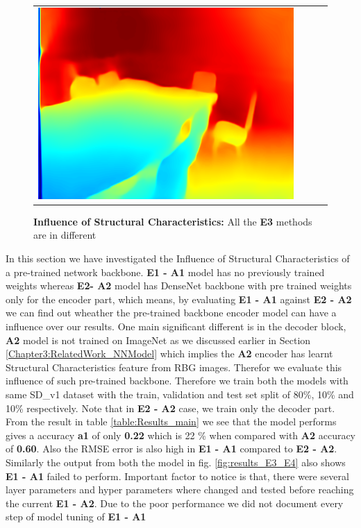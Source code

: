 \begin{figure}[h]
\begin{tabular}{@{}c@{ }c@{ }c@{ }c@{}}
\includegraphics[width=.3\linewidth]{Figures/results/s1_a1/0Predicted.png}\\[-1ex]
\end{tabular}
\caption{\textbf{Influence of Structural Characteristics:} All the \textbf{E3} methods are in different  }%
\label{fig:results_E1_E2}
\end{figure}

\label{Chapter6:Influence_Structural_Char}
In this section we have investigated the Influence of Structural Characteristics of a pre-trained network backbone. \textbf{E1 - A1} model has no previously trained weights whereas \textbf{E2- A2} model has DenseNet backbone with pre trained weights only for the encoder part, which means, by evaluating \textbf{E1 - A1} against \textbf{E2 - A2} we can find out wheather the pre-trained backbone encoder model can have a influence over our results. One main significant different is in the decoder block, \textbf{A2} model is not trained on ImageNet as we discussed earlier in Section \ref{Chapter3:RelatedWork_NNModel} which implies the \textbf{A2} encoder has learnt Structural Characteristics feature from RBG images. Therefor we evaluate this influence of such pre-trained backbone. Therefore we train both the models with same SD\_v1 dataset with the train, validation and test set split of 80\%, 10\%  and 10\% respectively. Note that in \textbf{E2 - A2} case, we train only the decoder part. From the result in table \ref{table:Results_main} we see that the model performs gives a accuracy \textbf{a1} of only \textbf{0.22} which is 22 \% when compared with \textbf{A2} accuracy of \textbf{0.60}. Also the RMSE error is also high in \textbf{E1 - A1} compared to \textbf{E2 - A2}. Similarly the output from both the model in fig. \ref{fig:results_E3_E4} also shows  \textbf{E1 - A1} failed to perform. Important factor to notice is that, there were several layer parameters and hyper parameters where changed and tested before reaching the current \textbf{E1 - A2}. Due to the poor performance we did not document every step of model tuning of \textbf{E1 - A1} 

